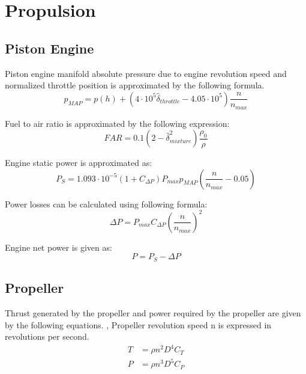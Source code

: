 \chapter{Propulsion}

\section{Piston Engine}

Piston engine manifold absolute pressure due to engine revolution speed and normalized throttle position is approximated by the following formula.
\begin{equation}
  p_{MAP}
  =
  p \left( h \right)
  +
  \left(
    4 \cdot 10^5 \hat \delta_{throttle}
    -
    4.05 \cdot 10^5
  \right)
  \frac{n}{n_{max}}
\end{equation}

Fuel to air ratio is approximated by the following expression: \cite{Allerton2009}
\begin{equation}
  FAR = 0.1 \left( 2 - {\hat \delta}_{mixture}^2 \right) \frac{\rho_0}{\rho}
\end{equation}

Engine static power is approximated as:
\begin{equation}
  P_S =
  1.093 \cdot 10^{-5} \left( 1 + C_{\Delta P} \right) P_{max} p_{MAP}
  \left( \frac{n}{n_{max}} - 0.05 \right)
\end{equation}

Power losses can be calculated using following formula:
\begin{equation}
  \Delta P = P_{max} C_{\Delta P} \left( \frac{n}{n_{max}} \right)^2
\end{equation}

Engine net power is given as:
\begin{equation}
  P = P_S - \Delta P
\end{equation}

\section{Propeller}

Thrust generated by the propeller and power required by the propeller are given by the following equations. \cite{Allerton2009}, \cite{Raymer1992} Propeller revolution speed n is expressed in revolutions per second.
\begin{align}
  T &= \rho n^2 D^4 C_T \\
  P &= \rho n^3 D^5 C_P
\end{align}

